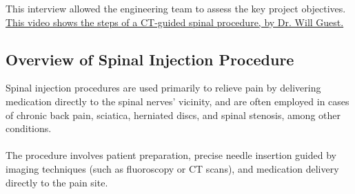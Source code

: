 \documentclass[12pt]{article}
\begin{document}
This interview allowed the engineering team to assess the key project objectives.\\

\href{https://www.youtube.com/watch?v=NSqduAn1Zb4}{This video shows the steps of a CT-guided spinal procedure, by Dr. Will Guest.}

\subsection{Overview of Spinal Injection Procedure} 
\label{spine-procedure:Overview of Spinal Injection Procedure}

Spinal injection procedures are used primarily to relieve pain by delivering medication directly to the spinal nerves' vicinity, and are often employed in cases of chronic back pain, sciatica, herniated discs, and spinal stenosis, among other conditions.\\
\\
The procedure involves patient preparation, precise needle insertion guided by imaging techniques (such as fluoroscopy or CT scans), and medication delivery directly to the pain site. \\
\end{document}
